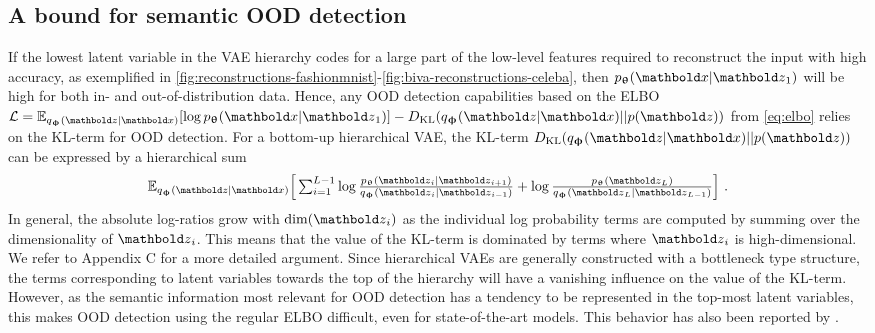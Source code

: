 \subsection{A bound for semantic OOD detection}
If the lowest latent variable in the VAE hierarchy codes for a large part of the low-level features required to reconstruct the input with high accuracy, as exemplified in \cref{fig:reconstructions-fashionmnist}-\ref{fig:biva-reconstructions-celeba}, then $p_\thetab(\xb|\zb_1)$ will be high for both in- and out-of-distribution data.
Hence, any OOD detection capabilities based on the ELBO $\mathcal{L} = \mathbb{E}_{q_\phib(\zb|\xb)}[\log p_\thetab(\xb|\zb_1)] - D_{\mathrm{KL}}( q_\phib(\zb|\xb) || p(\zb))$ from \eqref{eq:elbo} relies on the KL-term for OOD detection. For a bottom-up hierarchical VAE, the KL-term $D_{\mathrm{KL}}( q_\phib(\zb|\xb) || p(\zb))$ can be expressed by a hierarchical sum%
\begin{equation}
    \mathbb{E}_{q_\phib(\zb|\xb)} \Big[ \textstyle\sum_{i=1}^{L-1} \log \frac{p_\thetab(\zb_i|\zb_{i+1})}{q_\phib(\zb_i|\zb_{i-1})} + \log \frac{p_\thetab(\zb_L)}{q_\phib(\zb_L|\zb_{L-1})} \Big] \ .
\end{equation}
In general, the absolute log-ratios grow with $\mathrm{dim}(\zb_i)$ as the individual log probability terms are computed by summing over the dimensionality of $\zb_i$.
This means that the value of the KL-term is dominated by terms where $\zb_i$ is high-dimensional. We refer to Appendix C for a more detailed argument.
Since hierarchical VAEs are generally constructed with a bottleneck type structure, the terms corresponding to latent variables towards the top of the hierarchy will have a vanishing influence on the value of the KL-term.
However, as the semantic information most relevant for OOD detection has a tendency to be represented in the top-most latent variables, this makes OOD detection using the regular ELBO difficult, even for state-of-the-art models.
This behavior has also been reported by \textcite{xiao_likelihood_2020}.

